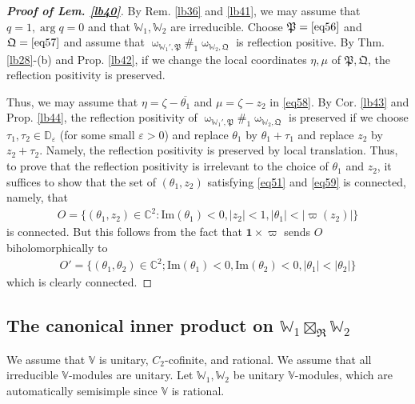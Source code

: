 \documentclass[11pt,b5paper,notitlepage]{article}
\theoremstyle{definition}
\theoremstyle{plain}
\newcommand{\fk}{\mathfrak}
\newcommand{\ovl}{\overline}
\newcommand{\id}{\mathbf{1}}
\newcommand{\Vbb}{\mathbb V}
\newcommand{\Wbb}{\mathbb W}
\newcommand{\Cbb}{\mathbb C}
\newcommand{\Dbb}{\mathbb D}
\newcommand{\Imag}{\mathrm{Im}}
\numberwithin{equation}{section}
\begin{document}
\begin{proof}[\textbf{Proof of Lem. \ref{lb40}}]
By Rem. \ref{lb36} and \ref{lb41}, we may assume that $q=1,\arg q=0$ and that $\Wbb_1,\Wbb_2$ are irreducible. Choose $\fk P=\eqref{eq56}$ and $\fk Q=\eqref{eq57}$ and assume that $\upomega_{\Wbb_1',\fk P}\#_1\upomega_{\Wbb_2,\fk Q}$ is reflection positive. By Thm. \ref{lb28}-(b) and Prop. \ref{lb42}, if we change the local coordinates $\eta,\mu$ of $\fk P,\fk Q$, the reflection positivity is preserved.

Thus, we may assume that $\eta=\zeta-\ovl{\theta_1}$ and $\mu=\zeta-z_2$ in \eqref{eq58}. By Cor. \ref{lb43} and Prop. \ref{lb44}, the reflection positivity of $\upomega_{\Wbb_1',\fk P}\#_1\upomega_{\Wbb_2,\fk Q}$ is preserved if we choose $\tau_1,\tau_2\in\Dbb_\varepsilon$ (for some small $\varepsilon>0$) and replace $\theta_1$ by $\theta_1+\tau_1$ and replace $z_2$ by $z_2+\tau_2$. Namely, the reflection positivity is preserved by local translation. Thus, to prove that the reflection positivity is irrelevant to the choice of $\theta_1$ and $z_2$, it suffices to show that the set of $(\theta_1,z_2)$ satisfying \eqref{eq51} and \eqref{eq59} is connected, namely, that
\begin{align*}
O=\{(\theta_1,z_2)\in\Cbb^2:\Imag(\theta_1)<0,|z_2|<1,|\theta_1|<|\varpi(z_2)|\}
\end{align*}
is connected. But this follows from the fact that $\id\times\varpi$ sends $O$ biholomorphically to 
\begin{align*}
O'=\{(\theta_1,\theta_2)\in\Cbb^2;\Imag(\theta_1)<0,\Imag(\theta_2)<0,|\theta_1|<|\theta_2|\}
\end{align*}
which is clearly connected.
\end{proof}

\subsection{The canonical inner product on $\Wbb_1\boxtimes_{\fk R}\Wbb_2$}\label{lb47}


We assume that $\Vbb$ is unitary, $C_2$-cofinite, and rational. We assume that all irreducible $\Vbb$-modules are unitary. Let $\Wbb_1,\Wbb_2$ be unitary $\Vbb$-modules, which are automatically semisimple since $\Vbb$ is rational. 
\end{document}
